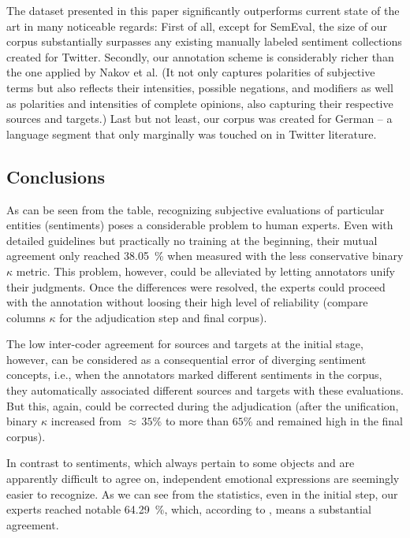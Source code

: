 The dataset presented in this paper significantly outperforms current
state of the art in many noticeable regards: First of all, except for
SemEval, the size of our corpus substantially surpasses any existing
manually labeled sentiment collections created for Twitter.  Secondly,
our annotation scheme is considerably richer than the one applied by
Nakov et al. (It not only captures polarities of subjective terms but
also reflects their intensities, possible negations, and modifiers as
well as polarities and intensities of complete opinions, also
capturing their respective sources and targets.) Last but not least,
our corpus was created for German -- a language segment that only
marginally was touched on in Twitter literature.


\subsection{Conclusions}
As can be seen from the table, recognizing subjective evaluations of
particular entities (sentiments) poses a considerable problem to human
experts.  Even with detailed guidelines but practically no training at
the beginning, their mutual agreement only reached 38.05~\% when
measured with the less conservative binary $\kappa$ metric.  This
problem, however, could be alleviated by letting annotators unify
their judgments.  Once the differences were resolved, the experts
could proceed with the annotation without loosing their high level of
reliability (compare columns $\kappa$ for the adjudication step and
final corpus).

The low inter-coder agreement for sources and targets at the initial
stage, however, can be considered as a consequential error of
diverging sentiment concepts, i.e., when the annotators marked
different sentiments in the corpus, they automatically associated
different sources and targets with these evaluations.  But this,
again, could be corrected during the adjudication (after the
unification, binary $\kappa$ increased from $\approx\,35\%$ to more
than $65\%$ and remained high in the final corpus).

In contrast to sentiments, which always pertain to some objects and
are apparently difficult to agree on, independent emotional
expressions are seemingly easier to recognize.  As we can see from the
statistics, even in the initial step, our experts reached notable
64.29~\%, which, according to \citet{Landis:77}, means a substantial
agreement.

